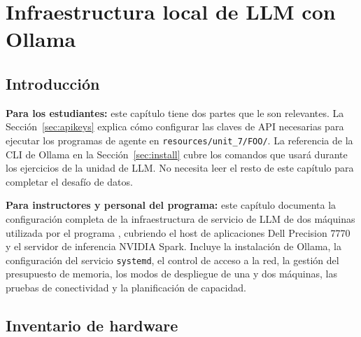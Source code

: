 %

\chapter{Infraestructura local de LLM con Ollama}
\label{ch:ollama-infrastructure}

\section{Introducción}

\vs
\noindent
\textbf{Para los estudiantes:} este capítulo tiene dos partes que le son relevantes.
La Sección~\ref{sec:apikeys} explica cómo configurar las claves de API
necesarias para ejecutar los programas de agente en
\texttt{resources/unit\_7/FOO/}. La referencia de la CLI de Ollama en la
Sección~\ref{sec:install} cubre los comandos que usará durante
los ejercicios de la unidad de LLM. No necesita leer el resto
de este capítulo para completar el desafío de datos.
\vs

\vs
\noindent
\textbf{Para instructores y personal del programa:} este capítulo documenta
la configuración completa de la infraestructura de servicio de LLM de dos
máquinas utilizada por el programa \ProjectName{}, cubriendo el host de
aplicaciones Dell Precision 7770 y el servidor de inferencia NVIDIA Spark.
Incluye la instalación de Ollama, la configuración del servicio
\texttt{systemd}, el control de acceso a la red, la gestión del presupuesto
de memoria, los modos de despliegue de una y dos máquinas, las pruebas de
conectividad y la planificación de capacidad.
\vs

\section{Inventario de hardware}
\label{sec:hardware}

